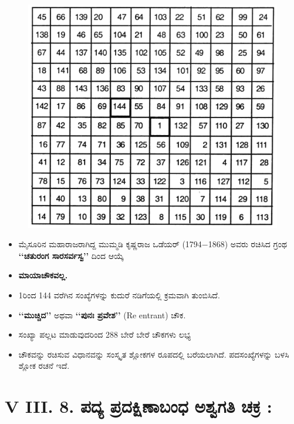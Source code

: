 \begin{figure}[H]
\includegraphics[scale=1.1]{src/figures/chap6/fig6-10.jpg}
\end{figure}
\begin{itemize}
	\item ಮೈಸೂರಿನ ಮಹಾರಾಜರಾಗಿದ್ದ ಮುಮ್ಮಡಿ ಕೃಷ್ಣರಾಜ ಒಡೆಯರ್ (1794$-$1868) ಅವರು ರಚಿಸಿದ ಗ್ರಂಥ \textbf{‘‘ಚತುರಂಗ ಸಾರಸರ್ವಸ್ವ’’} ದಿಂದ ಆಯ್ಕೆ \smallskip
	\item \textbf{ಮಾಯಾಚೌಕವಲ್ಲ.}\smallskip
	\item 1ರಿಂದ 144 ವರೆಗಿನ ಸಂಖ್ಯೆಗಳನ್ನು ಕುದುರೆ ನಡಿಗೆಯಲ್ಲಿ ಕ್ರಮವಾಗಿ ತುಂಬಿಸಿದೆ.\smallskip
	\item \textbf{‘‘ಮುಚ್ಚಿದ’’} ಅಥವಾ \textbf{‘‘ಪುನಃ ಪ್ರವೇಶ’’} (Re entrant) ಚೌಕ.\smallskip
	\item ಸಂಖ್ಯಾ ಪಲ್ಲಟ ಮಾಡುವುದರಿಂದ 288 ಬೇರೆ ಬೇರೆ ಚೌಕಗಳು ಲಭ್ಯ\smallskip
	\item ಚೌಕವನ್ನು ರಚಿಸುವ ವಿಧಾನವನ್ನು ಸಂಸ್ಕೃತ ಶ್ಲೋಕಗಳ ರೂಪದಲ್ಲಿ ಬರೆಯಲಾಗಿದೆ. ಪದಸಂಖ್ಯೆಗಳನ್ನು ಬಳಸಿ ಶ್ಲೋಕ ರಚನೆ ಇದೆ.
\end{itemize}

\section*{V III. 8. ಪದ್ಯ ಪ್ರದಕ್ಷಿಣಾಬಂಧ ಅಶ್ವಗತಿ ಚಕ್ರ :}

